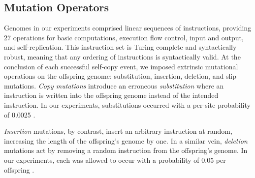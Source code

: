 \subsection{Mutation Operators}

Genomes in our experiments comprised linear sequences of instructions, providing 27 operations for basic computations, execution flow control, input and output, and self-replication.
This instruction set is Turing complete and syntactically robust, meaning that any ordering of instructions is syntactically valid.
At the conclusion of each successful self-copy event, we imposed extrinsic mutational operations on the offspring genome: substitution, insertion, deletion, and slip mutations.
\textit{Copy mutations} introduce an erroneous \textit{substitution} where an instruction is written into the offspring genome instead of the intended instruction.
In our experiments, substitutions occurred with a per-site probability of 0.0025 \citep{lenski2003evolutionary}.

\textit{Insertion} mutations, by contrast, insert an arbitrary instruction at random, increasing the length of the offspring's genome by one.
In a similar vein, \textit{deletion} mutations act by removing a random instruction from the offspring's genome.
In our experiments, each was allowed to occur with a probability of 0.05 per offspring \citep{lenski2003evolutionary}.

